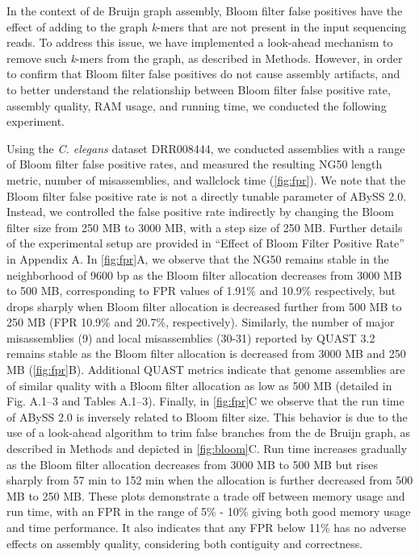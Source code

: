 \documentclass[
  12pt,
  oneside,
  openany]{book}
\begin{document}
In the context of de Bruijn graph assembly, Bloom filter false positives have the effect of adding to the graph \emph{k}-mers that are not present in the input sequencing reads. To address this issue, we have implemented a look-ahead mechanism to remove such \emph{k}-mers from the graph, as described in Methods. However, in order to confirm that Bloom filter false positives do not cause assembly artifacts, and to better understand the relationship between Bloom filter false positive rate, assembly quality, RAM usage, and running time, we conducted the following experiment.

Using the \emph{C. elegans} dataset DRR008444, we conducted assemblies with a range of Bloom filter false positive rates, and measured the resulting NG50 length metric, number of misassemblies, and wallclock time (\cref{fig:fpr}). We note that the Bloom filter false positive rate is not a directly tunable parameter of ABySS 2.0. Instead, we controlled the false positive rate indirectly by changing the Bloom filter size from 250 MB to 3000 MB, with a step size of 250 MB. Further details of the experimental setup are provided in ``Effect of Bloom Filter Positive Rate'' in Appendix A. In \cref{fig:fpr}A, we observe that the NG50 remains stable in the neighborhood of 9600 bp as the Bloom filter allocation decreases from 3000 MB to 500 MB, corresponding to FPR values of 1.91\% and 10.9\% respectively, but drops sharply when Bloom filter allocation is decreased further from 500 MB to 250 MB (FPR 10.9\% and 20.7\%, respectively). Similarly, the number of major misassemblies (9) and local misassemblies (30-31) reported by QUAST 3.2 remains stable as the Bloom filter allocation is decreased from 3000 MB and 250 MB (\cref{fig:fpr}B). Additional QUAST metrics indicate that genome assemblies are of similar quality with a Bloom filter allocation as low as 500 MB (detailed in Fig. A.1--3 and Tables A.1--3). Finally, in \cref{fig:fpr}C we observe that the run time of ABySS 2.0 is inversely related to Bloom filter size. This behavior is due to the use of a look-ahead algorithm to trim false branches from the de Bruijn graph, as described in Methods and depicted in \cref{fig:bloom}C. Run time increases gradually as the Bloom filter allocation decreases from 3000 MB to 500 MB but rises sharply from 57 min to 152 min when the allocation is further decreased from 500 MB to 250 MB. These plots demonstrate a trade off between memory usage and run time, with an FPR in the range of 5\% - 10\% giving both good memory usage and time performance. It also indicates that any FPR below 11\% has no adverse effects on assembly quality, considering both contiguity and correctness.
\end{document}
